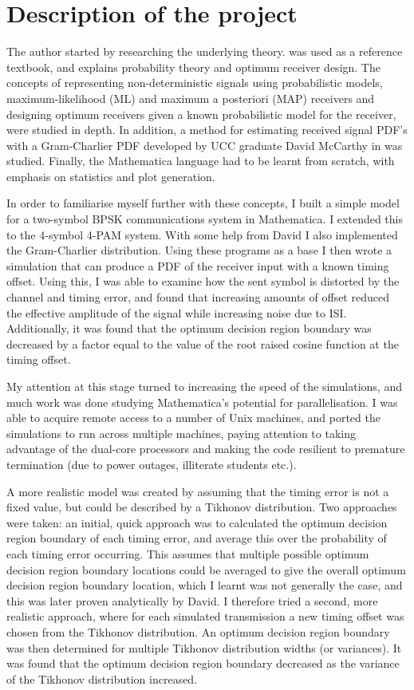 \chapter{Description of the project}

The author started by researching the underlying theory. \cite{[8]} was used as a reference textbook, and explains probability theory and optimum receiver design. The concepts of representing non-deterministic signals using probabilistic models,  maximum-likelihood (ML) and maximum a posteriori (MAP) receivers and designing optimum receivers given a known probabilistic model for the receiver, were studied in depth. In addition, a method for estimating received signal PDF's with a Gram-Charlier PDF developed by UCC graduate David McCarthy in \cite{[1]} was studied. Finally, the Mathematica language had to be learnt from scratch, with emphasis on statistics and plot generation.

In order to familiarise myself further with these concepts, I built a
simple model for a two-symbol BPSK communications system in Mathematica.
I extended this to the 4-symbol 4-PAM system. With some help from David I also
implemented the Gram-Charlier distribution. Using these programs as a
base I then wrote a simulation that can produce a PDF of the receiver input
with a known timing offset. Using this, I was able to examine how the
sent symbol is distorted by the channel and timing error, and found that
increasing amounts of offset reduced the effective amplitude of the
signal while increasing noise due to ISI. Additionally, it was found
that the optimum decision region boundary was decreased by a factor
equal to the value of the root raised cosine function at the timing
offset.

My attention at this stage turned to increasing the speed of the
simulations, and much work was done studying Mathematica's potential for
parallelisation. I was able to acquire remote access to a number of Unix
machines, and ported the simulations to run across multiple machines,
paying attention to taking advantage of the dual-core processors and
making the code resilient to premature termination (due to power outages,
illiterate students etc.).

A more realistic model was created by assuming that the timing error is
not a fixed value, but could be described by a Tikhonov distribution.
Two approaches were taken: an initial, quick approach was to calculated
the optimum decision region boundary of each timing error, and average
this over the probability of each timing error occurring. This assumes
that multiple possible optimum decision region boundary locations could
be averaged to give the overall optimum decision region boundary
location, which I learnt was not generally the case, and this was later
proven analytically by David. I therefore tried a second, more realistic
approach, where for each simulated transmission a new timing offset was
chosen from the Tikhonov distribution. An optimum decision region
boundary was then determined for multiple Tikhonov distribution widths
(or variances). It was found that the optimum decision region boundary
decreased as the variance of the Tikhonov distribution increased.

